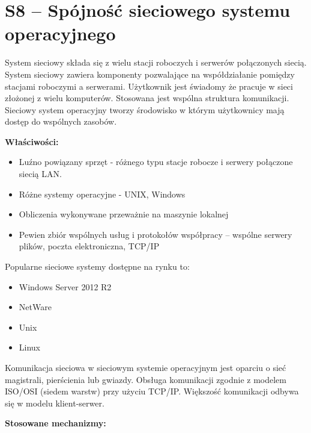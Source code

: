 \section{S8 -- Spójność sieciowego systemu operacyjnego}


System sieciowy składa się z wielu stacji roboczych i serwerów połączonych siecią. System sieciowy zawiera komponenty pozwalające na współdziałanie pomiędzy stacjami roboczymi a serwerami. Użytkownik jest świadomy że pracuje w sieci złożonej z wielu komputerów. Stosowana jest wspólna struktura komunikacji. Sieciowy system operacyjny tworzy środowisko w którym użytkownicy mają dostęp do wspólnych zasobów.
 
\textbf{Właściwości:}

\begin{itemize}
	\item Luźno powiązany sprzęt - różnego typu stacje robocze i serwery połączone siecią LAN.
	\item Różne systemy operacyjne - UNIX, Windows
	\item Obliczenia wykonywane przeważnie na maszynie lokalnej
	\item Pewien zbiór wspólnych usług i protokołów współpracy – wspólne serwery plików, poczta elektroniczna, TCP/IP
\end{itemize}
 
Popularne sieciowe systemy dostępne na rynku to:
\begin{itemize}
    \item Windows Server 2012 R2
    \item NetWare
    \item Unix
    \item Linux
\end{itemize}

Komunikacja sieciowa w sieciowym systemie operacyjnym jest oparciu o sieć magistrali, pierścienia lub gwiazdy. Obsługa komunikacji zgodnie z modelem ISO/OSI (siedem warstw) przy użyciu TCP/IP. Większość komunikacji odbywa się w modelu klient-serwer. 

\textbf{Stosowane mechanizmy:}

